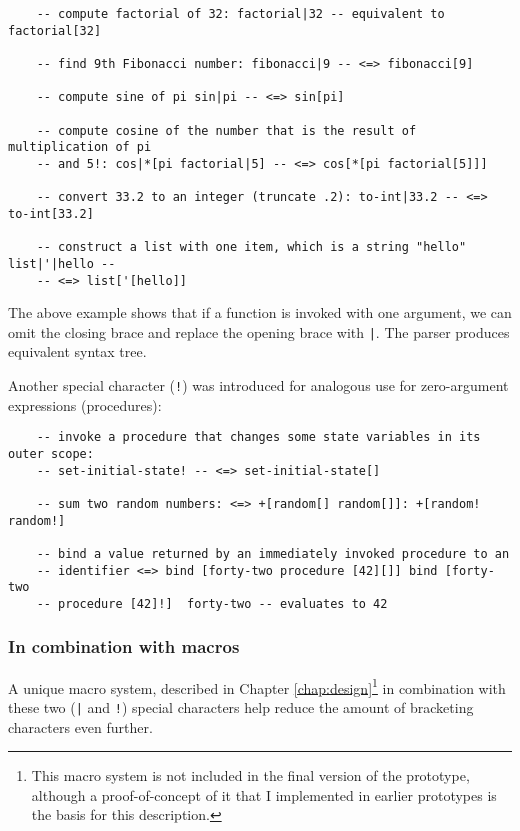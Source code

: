 \begin{lstlisting}
    -- compute factorial of 32: factorial|32 -- equivalent to factorial[32]
    
    -- find 9th Fibonacci number: fibonacci|9 -- <=> fibonacci[9]
    
    -- compute sine of pi sin|pi -- <=> sin[pi]
    
    -- compute cosine of the number that is the result of multiplication of pi
    -- and 5!: cos|*[pi factorial|5] -- <=> cos[*[pi factorial[5]]]
    
    -- convert 33.2 to an integer (truncate .2): to-int|33.2 -- <=> to-int[33.2]
    
    -- construct a list with one item, which is a string "hello" list|'|hello --
    -- <=> list['[hello]]
\end{lstlisting}

The above example shows that if a function is invoked with one argument, we can
omit the closing brace and replace the opening brace with \texttt{|}. The parser
produces equivalent syntax tree.

Another special character (\texttt{!}) was introduced for analogous use for
zero-argument expressions (procedures):
\begin{lstlisting}
    -- invoke a procedure that changes some state variables in its outer scope:
    -- set-initial-state! -- <=> set-initial-state[]
    
    -- sum two random numbers: <=> +[random[] random[]]: +[random! random!]
    
    -- bind a value returned by an immediately invoked procedure to an
    -- identifier <=> bind [forty-two procedure [42][]] bind [forty-two
    -- procedure [42]!]  forty-two -- evaluates to 42
\end{lstlisting}

\subsubsection{In combination with macros}\label{subsub:macros}
A unique macro system, described in Chapter \ref{chap:design}\footnote{This
  macro system is not included in the final version of the prototype, although a
  proof-of-concept of it that I implemented in earlier prototypes is the basis
  for this description. } in combination
with these two (\texttt{|} and \texttt{!}) special characters help reduce the
amount of bracketing characters even further.

